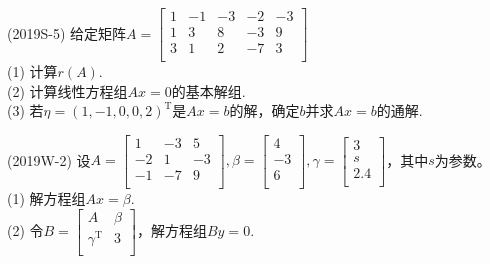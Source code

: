 \documentclass[lang=cn,newtx,10pt,scheme=chinese]{elegantbook}
\begin{document}
\begin{exercise}
    (2019S-5) 给定矩阵$A = 
    \left[
    \begin{matrix}
        1 & -1 & -3 & -2 & -3 \\
        1 & 3 & 8 & -3 & 9 \\
        3 & 1 & 2 & -7 & 3 \\
    \end{matrix}
    \right]
    $ \\
    (1) 计算$r(A)$. \\
    (2) 计算线性方程组$Ax = 0$的基本解组. \\
    (3) 若$\eta = (1, -1, 0, 0, 2)^\mathrm{T}$是$Ax = b$的解，确定$b$并求$Ax = b$的通解.
\end{exercise}

\begin{exercise}
    (2019W-2) 设$A=
    \left[
    \begin{matrix}
        1 & -3 & 5 \\
        -2 & 1 & -3 \\
        -1 & -7 & 9 \\
    \end{matrix}
    \right]
    ,\beta=
    \left[
    \begin{matrix}
        4 \\
        -3 \\
        6 \\
    \end{matrix}
    \right]
    ,\gamma=
    \left[
    \begin{matrix}
        3 \\
        s \\
        2.4 \\
    \end{matrix}
    \right]
    $，其中$s$为参数。\\
    (1) 解方程组$Ax=\beta$. \\
    (2) 令$B=
    \left[
    \begin{matrix}
        A & \beta \\
        \gamma^\mathrm{T} & 3 \\
    \end{matrix}
    \right]
    $，解方程组$By = 0$.
\end{exercise}
\end{document}
